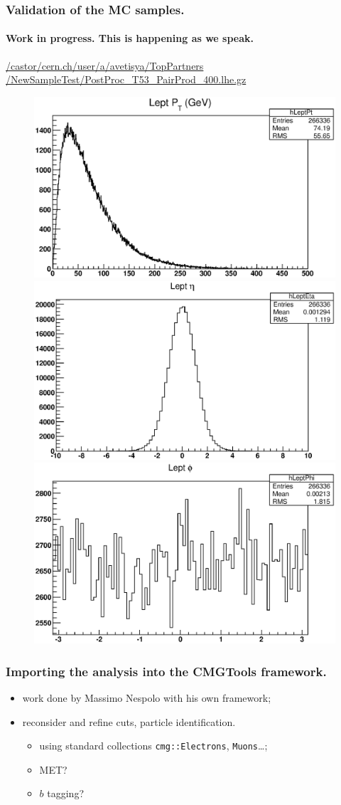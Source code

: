 \documentclass[ukenglish]{beamer}
\begin{document}
\begin{frame}
    \frametitle{Validation of the MC samples.}
    \framesubtitle{Work in progress. This is happening as we speak.}
    \url{/castor/cern.ch/user/a/avetisya/TopPartners}\\
    \url{/NewSampleTest/PostProc_T53_PairProd_400.lhe.gz}
    \begin{figure}[h]
        \begin{center}
            \includegraphics[width=.3\textwidth]{lepton_pt.eps}
            \includegraphics[width=.3\textwidth]{lepton_eta.eps}
            \includegraphics[width=.3\textwidth]{lepton_phi.eps}
        \end{center}
    \end{figure}
\end{frame}

\begin{frame}
    \frametitle{Importing the analysis into the CMGTools framework.}
    \begin{itemize}
        \item work done by Massimo Nespolo with his own framework;
        \item reconsider and refine cuts, particle identification.
            \begin{itemize}
                \item using standard collections \texttt{cmg::Electrons},
                    \texttt{Muons}\dots;
                \item MET?
                \item $b$ tagging?
            \end{itemize}
    \end{itemize}
\end{frame}
\end{document}
